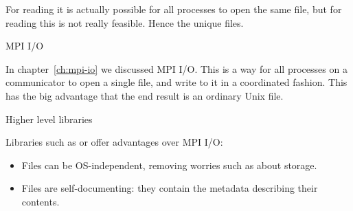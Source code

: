For reading it is actually possible for all processes to open the same file,
but for reading this is not really feasible. Hence the unique files.

 {MPI I/O}

In chapter~\ref{ch:mpi-io} we discussed MPI I/O.
This is a way for all processes on a communicator to open a single file,
and write to it in a coordinated fashion.
This has the big advantage that the end result is an ordinary Unix file.

 {Higher level libraries}

Libraries such as  or 
offer advantages over MPI I/O:
\begin{itemize}
\item Files can be OS-independent, removing worries such
  as about  storage.
\item Files are self-documenting: they contain the metadata describing their contents.
\end{itemize}


